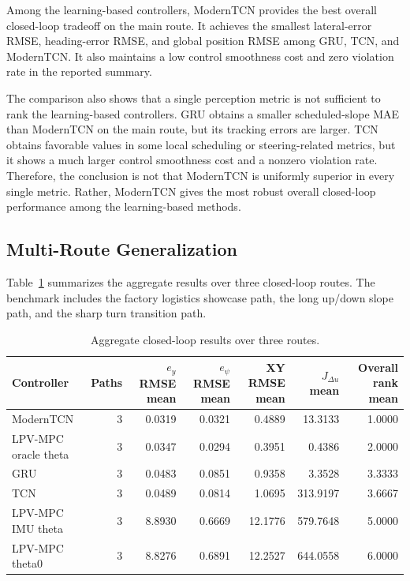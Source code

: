 \documentclass{ieeeaccess}
\begin{document}
Among the learning-based controllers, ModernTCN provides the best overall closed-loop tradeoff on the main route. It achieves the smallest lateral-error RMSE, heading-error RMSE, and global position RMSE among GRU, TCN, and ModernTCN. It also maintains a low control smoothness cost and zero violation rate in the reported summary.



The comparison also shows that a single perception metric is not sufficient to rank the learning-based controllers. GRU obtains a smaller scheduled-slope MAE than ModernTCN on the main route, but its tracking errors are larger. TCN obtains favorable values in some local scheduling or steering-related metrics, but it shows a much larger control smoothness cost and a nonzero violation rate. Therefore, the conclusion is not that ModernTCN is uniformly superior in every single metric. Rather, ModernTCN gives the most robust overall closed-loop performance among the learning-based methods.



\subsection{Multi-Route Generalization}



Table~\ref{tab:multipath_aggregate} summarizes the aggregate results over three closed-loop routes. The benchmark includes the factory logistics showcase path, the long up/down slope path, and the sharp turn transition path.



\begin{table}[!t]
\centering
\caption{Aggregate closed-loop results over three routes.}
\label{tab:multipath_aggregate}
\footnotesize
\begin{tabular}{lrrrrrr}
\hline
Controller & Paths & $e_y$ RMSE mean & $e_{\psi}$ RMSE mean & XY RMSE mean & $J_{\Delta u}$ mean & Overall rank mean \\
\hline
ModernTCN & 3 & 0.0319 & 0.0321 & 0.4889 & 13.3133 & 1.0000 \\
LPV-MPC oracle theta & 3 & 0.0347 & 0.0294 & 0.3951 & 0.4386 & 2.0000 \\
GRU & 3 & 0.0483 & 0.0851 & 0.9358 & 3.3528 & 3.3333 \\
TCN & 3 & 0.0489 & 0.0814 & 1.0695 & 313.9197 & 3.6667 \\
LPV-MPC IMU theta & 3 & 8.8930 & 0.6669 & 12.1776 & 579.7648 & 5.0000 \\
LPV-MPC theta0 & 3 & 8.8276 & 0.6891 & 12.2527 & 644.0558 & 6.0000 \\
\hline
\end{tabular}
\end{table}
\end{document}
